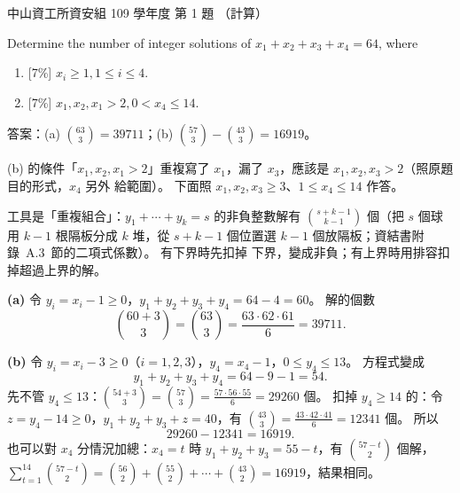 \begin{pastexam}[label={px:nsysu-109-dmalg-01}]{中山資工所資安組 109 學年度 第 1 題}
（計算）

Determine the number of integer solutions of $x_1+x_2+x_3+x_4=64$, where
\begin{enumerate}[label=(\alph*)]
\item {[7\%]} $x_i\ge 1, 1\le i\le 4$.
\item {[7\%]} $x_1,x_2,x_1>2, 0<x_4\le 14$.
\end{enumerate}
\end{pastexam}

\begin{pastsoln}
答案：(a) $\binom{63}{3} = 39711$；(b) $\binom{57}{3} - \binom{43}{3} = 16919$。

(b) 的條件「$x_1, x_2, x_1 > 2$」重複寫了 $x_1$，漏了 $x_3$，應該是 $x_1, x_2, x_3 > 2$（照原題目的形式，$x_4$ 另外
給範圍）。 下面照 $x_1, x_2, x_3 \ge 3$、$1 \le x_4 \le 14$ 作答。

工具是「重複組合」：$y_1 + \cdots + y_k = s$ 的非負整數解有 $\binom{s + k - 1}{k - 1}$ 個（把 $s$ 個球用 $k - 1$
根隔板分成 $k$ 堆，從 $s + k - 1$ 個位置選 $k - 1$ 個放隔板；資結書附錄~A.3~節的二項式係數）。 有下界時先扣掉
下界，變成非負；有上界時用排容扣掉超過上界的解。

\textbf{(a)} 令 $y_i = x_i - 1 \ge 0$，$y_1 + y_2 + y_3 + y_4 = 64 - 4 = 60$。 解的個數
\[
\binom{60 + 3}{3} = \binom{63}{3} = \frac{63 \cdot 62 \cdot 61}{6} = 39711 .
\]

\textbf{(b)} 令 $y_i = x_i - 3 \ge 0$（$i = 1, 2, 3$），$y_4 = x_4 - 1$，$0 \le y_4 \le 13$。 方程式變成
\[
y_1 + y_2 + y_3 + y_4 = 64 - 9 - 1 = 54 .
\]
先不管 $y_4 \le 13$：$\binom{54 + 3}{3} = \binom{57}{3} = \frac{57 \cdot 56 \cdot 55}{6} = 29260$ 個。 扣掉
$y_4 \ge 14$ 的：令 $z = y_4 - 14 \ge 0$，$y_1 + y_2 + y_3 + z = 40$，有 $\binom{43}{3} = \frac{43 \cdot 42 \cdot 41}{6}
= 12341$ 個。 所以
\[
29260 - 12341 = 16919 .
\]
也可以對 $x_4$ 分情況加總：$x_4 = t$ 時 $y_1 + y_2 + y_3 = 55 - t$，有 $\binom{57 - t}{2}$ 個解，
$\sum_{t=1}^{14} \binom{57 - t}{2} = \binom{56}{2} + \binom{55}{2} + \cdots + \binom{43}{2} = 16919$，結果相同。
\end{pastsoln}
